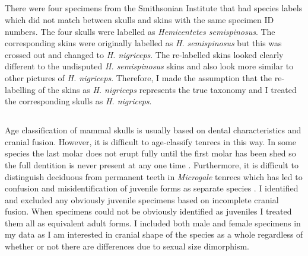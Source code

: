 \subsection{}
	
	There were four specimens from the Smithsonian Institute that had species labels which did not match between skulls and skins with the same specimen ID numbers. The four skulls were labelled as \textit{Hemicentetes semispinosus}. The corresponding skins were originally labelled as \textit{H. semispinosus} but this was crossed out and changed to \textit{H. nigriceps}. The re-labelled skins looked clearly different to the undisputed \textit{H. semispinosus} skins and also look more similar to other pictures of \textit{H. nigriceps}. Therefore, I made the assumption that the re-labelling of the skins as \textit{H. nigriceps} represents the true taxonomy and I treated the corresponding skulls as \textit{H. nigriceps}.

\subsection{}

	Age classification of mammal skulls is usually based on dental characteristics and cranial fusion.
 	However, it is difficult to age-classify tenrecs in this way. In some species the last molar does not erupt fully until the first molar has been shed so the full dentition is never present at any one time \citep{Nowak1983}. Furthermore, it is difficult to distinguish deciduous from permanent teeth in \textit{Microgale} tenrecs \citep{Asher2008} which has led to confusion and misidentification of juvenile forms as separate species \citep{Olson2004}.
 	I identified and excluded any obviously juvenile specimens based on incomplete cranial fusion. When specimens could not be obviously identified as juveniles I treated them all as equivalent adult forms. 	
	I included both male and female specimens in my data as I am interested in cranial shape of the species as a whole regardless of whether or not there are differences due to sexual size dimorphism.


\subsection{}
	

